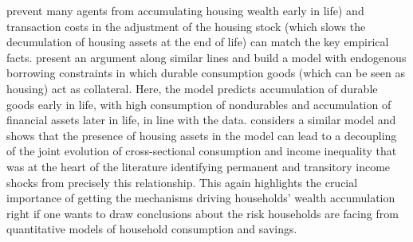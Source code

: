 prevent many agents from accumulating housing wealth early in life) and transaction
costs in the adjustment of the housing stock (which slows the decumulation of
housing assets at the end of life) can match the key empirical facts. 
\citet{FernandezVillaverdeKrueger2011} present an argument along similar lines 
and build a model with endogenous borrowing constraints in which durable consumption
goods (which can be seen as housing) act as collateral. Here, the model predicts
accumulation of durable goods early in life, with high consumption of nondurables
and accumulation of financial assets later in life, in line with the data. 
\citet{Iacoviello2008} considers a similar model and shows that the presence
of housing assets in the model can lead to a decoupling of the joint evolution
of cross-sectional consumption and income inequality that was at the heart of
the literature identifying permanent and transitory income shocks from precisely
this relationship. This again highlights the crucial importance of getting the 
mechanisms driving households' wealth accumulation right if one wants to draw 
conclusions about the risk households are facing from quantitative models of 
household consumption and savings.

